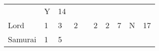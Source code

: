 \documentclass[12pt]{article}
\begin{document}
\begin{longtable}[]{@{}llllllllll@{}}
\begin{minipage}[t]{0.06\columnwidth}\raggedright\strut
\strut\end{minipage} &
\begin{minipage}[t]{0.07\columnwidth}\raggedright\strut
Y
\strut\end{minipage} &
\begin{minipage}[t]{0.08\columnwidth}\raggedright\strut
14
\strut\end{minipage}\tabularnewline
\begin{minipage}[t]{0.13\columnwidth}\raggedright\strut
Lord
\strut\end{minipage} &
\begin{minipage}[t]{0.06\columnwidth}\raggedright\strut
1
\strut\end{minipage} &
\begin{minipage}[t]{0.06\columnwidth}\raggedright\strut
3
\strut\end{minipage} &
\begin{minipage}[t]{0.06\columnwidth}\raggedright\strut
2
\strut\end{minipage} &
\begin{minipage}[t]{0.06\columnwidth}\raggedright\strut
\strut\end{minipage} &
\begin{minipage}[t]{0.06\columnwidth}\raggedright\strut
2
\strut\end{minipage} &
\begin{minipage}[t]{0.06\columnwidth}\raggedright\strut
2
\strut\end{minipage} &
\begin{minipage}[t]{0.06\columnwidth}\raggedright\strut
7
\strut\end{minipage} &
\begin{minipage}[t]{0.07\columnwidth}\raggedright\strut
N
\strut\end{minipage} &
\begin{minipage}[t]{0.08\columnwidth}\raggedright\strut
17
\strut\end{minipage}\tabularnewline
\begin{minipage}[t]{0.13\columnwidth}\raggedright\strut
Samurai
\strut\end{minipage} &
\begin{minipage}[t]{0.06\columnwidth}\raggedright\strut
1
\strut\end{minipage} &
\begin{minipage}[t]{0.06\columnwidth}\raggedright\strut
5
\strut\end{minipage} &

\end{longtable}
\end{document}
